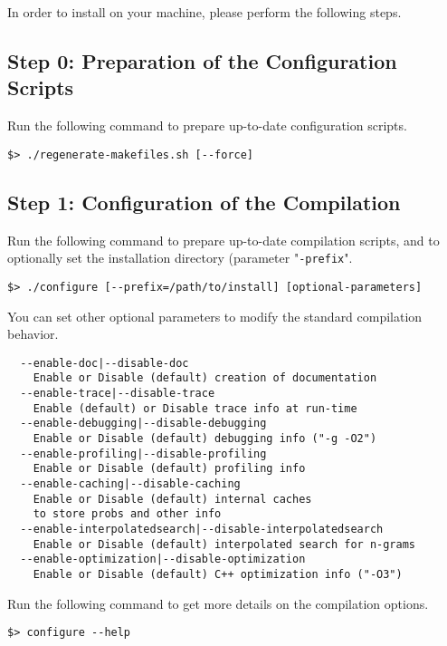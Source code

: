 
\noindent In order to install {\IRSTLM} on your machine, please perform the following steps.


\subsection{Step 0: Preparation of the Configuration Scripts}
Run the following command to prepare up-to-date configuration scripts.
\begin{verbatim}
$> ./regenerate-makefiles.sh [--force]
\end{verbatim}


\subsection{Step 1: Configuration of the Compilation}
Run the following command to prepare up-to-date compilation scripts, and to optionally set the installation directory (parameter "{\tt -prefix}".
\begin{verbatim}
$> ./configure [--prefix=/path/to/install] [optional-parameters]
\end{verbatim}

You can set other optional parameters to modify the standard compilation behavior.
\begin{verbatim}
  --enable-doc|--disable-doc
    Enable or Disable (default) creation of documentation
  --enable-trace|--disable-trace
    Enable (default) or Disable trace info at run-time
  --enable-debugging|--disable-debugging
    Enable or Disable (default) debugging info ("-g -O2")
  --enable-profiling|--disable-profiling
    Enable or Disable (default) profiling info
  --enable-caching|--disable-caching
    Enable or Disable (default) internal caches
    to store probs and other info
  --enable-interpolatedsearch|--disable-interpolatedsearch
    Enable or Disable (default) interpolated search for n-grams
  --enable-optimization|--disable-optimization
    Enable or Disable (default) C++ optimization info ("-O3")
\end{verbatim}


\noindent
Run the following command to get more details on the compilation options.
\begin{verbatim}
$> configure --help
\end{verbatim}


